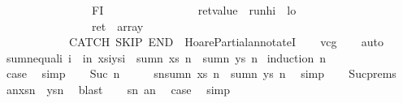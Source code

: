 \begin{isabellebody}
\ \ \ \ \ \ \ \ \ \ \ \ \ \ \ \ FI{\isacharsemicolon}{\isacharsemicolon}\isanewline
\ \ \ \ \ \ \ \ \ \ \ \ \ \ \ \ {\isasymacute}ret{\isacharunderscore}value\ {\isacharcolon}{\isacharequal}{\isacharequal}\ {\isasymacute}run{\isacharunderscore}hi\ {\isacharminus}\ {\isasymacute}lo{\isacharsemicolon}{\isacharsemicolon}\isanewline
\ \ \ \ \ \ \ \ \ \ \ \ \ \ \ \ {\isasymacute}ret\ {\isacharcolon}{\isacharequal}{\isacharequal}\ {\isasymacute}array\isanewline
\ \ \ \ \ \ \ \ \ \ \ \ CATCH\ SKIP\ END{\isachardoublequoteclose}\ \ HoarePartial{\isachardot}annotateI{\isacharparenright}\isanewline
\ \ \isamarkupfalse%
\ vcg\isanewline
\ \ \isamarkupfalse%
\ auto\isanewline
\ \ \isamarkupfalse%
%
\endisatagproof
{\isafoldproof}%
%
\isadelimproof
\isanewline
%
\endisadelimproof
\isanewline
\isanewline
\isanewline
{}\isamarkupfalse%
\ sumn{\isacharunderscore}equal{\isacharcolon}{\isachardoublequoteopen}{\isasymforall}i{\isachardot}\ i{\isasymge}{}\ {\isasymand}\ i{\isacharless}n{\isasymlongrightarrow}\ xs{\isacharbang}i{\isacharequal}ys{\isacharbang}i\ {\isasymLongrightarrow}\ sumn\ xs\ n\ {\isacharequal}\ sumn\ ys\ n{\isachardoublequoteclose}\isanewline
%
\isadelimproof
%
\endisadelimproof
%
\isatagproof
{}\isamarkupfalse%
\ {\isacharparenleft}induction\ n{\isacharparenright}\isanewline
\ \ \isamarkupfalse%
\ {}\isanewline
\ \ \isamarkupfalse%
\ \isamarkupfalse%
\ {\isacharquery}case\ \isamarkupfalse%
\ simp\isanewline
{}\isamarkupfalse%
\isanewline
\ \ \isamarkupfalse%
\ {\isacharparenleft}Suc\ n{\isacharparenright}\isanewline
\ \ \isamarkupfalse%
\ \isamarkupfalse%
\ sn{\isacharcolon}{\isachardoublequoteopen}sumn\ xs\ n\ {\isacharequal}\ sumn\ ys\ n{\isachardoublequoteclose}\ \isamarkupfalse%
\ simp\isanewline
\ \ \isamarkupfalse%
\ Suc{\isachardot}prems\ \isamarkupfalse%
\ an{\isacharcolon}{\isachardoublequoteopen}xs{\isacharbang}n\ {\isacharequal}\ ys{\isacharbang}n{\isachardoublequoteclose}\ \isamarkupfalse%
\ blast\isanewline
\ \ \isamarkupfalse%
\ sn\ an\ \isamarkupfalse%
\ {\isacharquery}case\ \isamarkupfalse%
\ simp\isanewline
{}\isamarkupfalse%
%
\endisatagproof
{\isafoldproof}%
%
\isadelimproof
\isanewline
%
\endisadelimproof
\isanewline
\isanewline
\isanewline
{}\isamarkupfalse%

\end{isabellebody}
